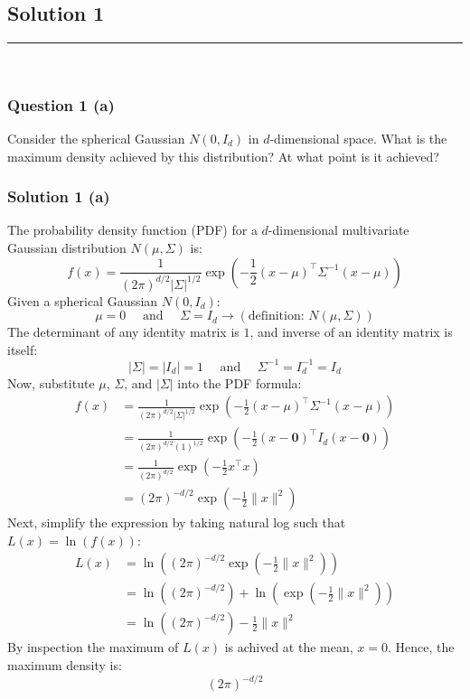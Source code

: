 \documentclass{article}
\begin{document}
\pagestyle{fancy}

\subsection*{Solution 1}
\noindent\rule{\textwidth}{0.4pt}\\
\subsubsection*{Question 1 (a)}
\begin{flushleft}
    Consider the spherical Gaussian $N(0, I_d)$ in $d$-dimensional space. 
    What is the maximum density achieved by this distribution? At what point is it achieved? 
\end{flushleft}

\subsubsection*{Solution 1 (a)}
The probability density function (PDF) for a $d$-dimensional multivariate Gaussian distribution $N(\mu, \Sigma)$ is:
$$ f(x) = \frac{1}{(2\pi)^{d/2} |\Sigma|^{1/2}} \exp\left( -\frac{1}{2} (x - \mu)^\top \Sigma^{-1} (x - \mu) \right) $$
Given a spherical Gaussian $N(0, I_d)$:
$$\mu = 0 \quad \text{ and }\quad \Sigma = I_d \rightarrow (\text{definition: }N(\mu, \Sigma))$$
The determinant of any identity matrix is $1$, and inverse of an identity matrix is itself:
$$|\Sigma| = |I_d| = 1 \quad \text{ and }\quad \Sigma^{-1} = I_d^{-1} = I_d$$
Now, substitute $\mu$, $\Sigma$, and $|\Sigma|$ into the PDF formula:
\begin{align*}
    f(x) &= \frac{1}{(2\pi)^{d/2} |\Sigma|^{1/2}} \exp\left( -\frac{1}{2} (x - \mu)^\top \Sigma^{-1} (x - \mu) \right) \\
    &= \frac{1}{(2\pi)^{d/2} (1)^{1/2}} \exp\left( -\frac{1}{2} (x - \mathbf{0})^\top I_d (x - \mathbf{0}) \right) \\
    &= \frac{1}{(2\pi)^{d/2}} \exp\left( -\frac{1}{2} x^\top x \right) \\
    &= (2\pi)^{-d/2} \exp\left( -\frac{1}{2} \|x\|^2 \right)
\end{align*}
Next, simplify the expression by taking natural log such that $L(x)=\ln(f(x))$:
\begin{align*}
    L(x) &= \ln\left((2\pi)^{-d/2} \exp\left( -\frac{1}{2} \|x\|^2 \right)\right) \\
    &= \ln\left((2\pi)^{-d/2}\right) + \ln\left(\exp\left( -\frac{1}{2} \|x\|^2 \right)\right) \\
    &= \ln\left((2\pi)^{-d/2}\right) - \frac{1}{2} \|x\|^2  
\end{align*}
By inspection the maximum of $L(x)$ is achived at the mean, $x = 0$.
Hence, the maximum density is:
$$(2\pi)^{-d/2}$$
\end{document}
